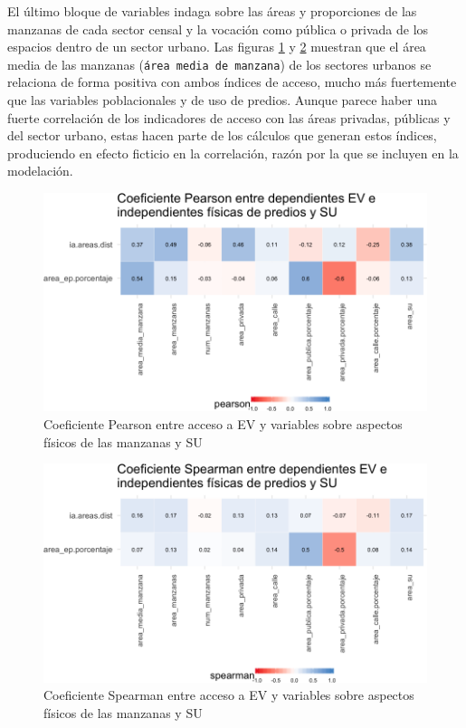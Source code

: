 \documentclass[12pt,a4paper,oneside, openany]{book}
\theoremstyle{definition}
\theoremstyle{definition}
\theoremstyle{definition}
\theoremstyle{remark}
\begin{document}
El último bloque de variables indaga sobre las áreas y proporciones de
las manzanas de cada sector censal y la vocación como pública o privada
de los espacios dentro de un sector urbano. Las figuras
\ref{fig:tile-ev-fisica-pearson} y \ref{fig:tile-ev-fisica-spearman}
muestran que el área media de las manzanas
(\texttt{área\ media\ de\ manzana}) de los sectores urbanos se relaciona
de forma positiva con ambos índices de acceso, mucho más fuertemente que
las variables poblacionales y de uso de predios. Aunque parece haber una
fuerte correlación de los indicadores de acceso con las áreas privadas,
públicas y del sector urbano, estas hacen parte de los cálculos que
generan estos índices, produciendo en efecto ficticio en la correlación,
razón por la que se incluyen en la modelación.

\begin{figure}[H]

{\centering \includegraphics[width=1\linewidth]{tesis-unigis_files/figure-latex/tile-ev-fisica-pearson-1} 

}

\caption{Coeficiente Pearson entre acceso a EV y variables sobre aspectos físicos de las manzanas y SU}\label{fig:tile-ev-fisica-pearson}
\end{figure}

\begin{figure}[H]

{\centering \includegraphics[width=1\linewidth]{tesis-unigis_files/figure-latex/tile-ev-fisica-spearman-1} 

}

\caption{Coeficiente Spearman entre acceso a EV y variables sobre aspectos físicos de las manzanas y SU}\label{fig:tile-ev-fisica-spearman}
\end{figure}
\end{document}
